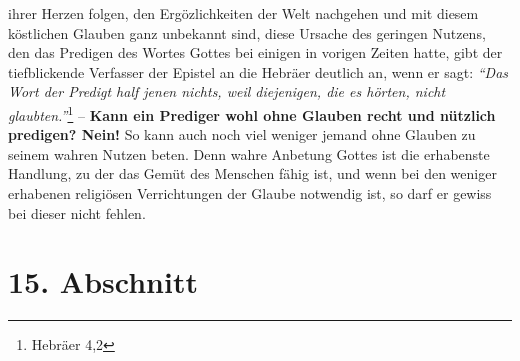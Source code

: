 ihrer Herzen folgen, den Ergözlichkeiten der Welt nachgehen und mit diesem
köstlichen Glauben ganz unbekannt sind, diese Ursache des geringen Nutzens, den
das Predigen  des Wortes Gottes bei einigen in vorigen Zeiten
hatte, gibt der
tiefblickende Verfasser der Epistel an die Hebräer
deutlich an, wenn er sagt:
\textit{"`Das Wort der Predigt half jenen nichts, weil
diejenigen, die es hörten, nicht glaubten."'}\footnote{Hebräer 4,2}
\label{ref:06_14_predigt}
-- \textbf{Kann
ein
Prediger wohl ohne Glauben recht und nützlich predigen? Nein!} So kann auch noch
viel weniger jemand ohne Glauben zu seinem wahren Nutzen beten. Denn wahre
Anbetung Gottes ist die erhabenste Handlung, zu der das Gemüt des Menschen fähig
ist, und wenn bei den weniger erhabenen religiösen Verrichtungen der Glaube
notwendig ist, so darf er gewiss bei dieser nicht fehlen.

\section{15. Abschnitt} \label{kap6_ab15}

